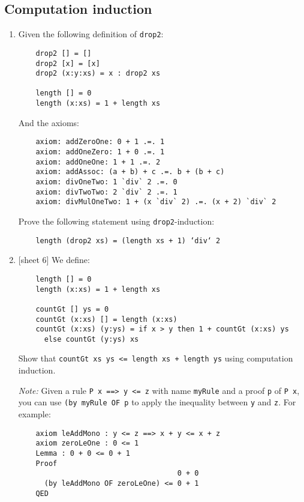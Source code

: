 \documentclass{article}
\def\code#1{\texttt{#1}}
\begin{document}
\subsection{Computation induction}
\begin{enumerate}
    \item Given the following definition of \code{drop2}:
        \begin{verbatim}
    drop2 [] = []
    drop2 [x] = [x]
    drop2 (x:y:xs) = x : drop2 xs

    length [] = 0
    length (x:xs) = 1 + length xs
        \end{verbatim}
        And the axioms:
        \begin{verbatim}
    axiom: addZeroOne: 0 + 1 .=. 1
    axiom: addOneZero: 1 + 0 .=. 1
    axiom: addOneOne: 1 + 1 .=. 2
    axiom: addAssoc: (a + b) + c .=. b + (b + c)
    axiom: divOneTwo: 1 `div` 2 .=. 0
    axiom: divTwoTwo: 2 `div` 2 .=. 1
    axiom: divMulOneTwo: 1 + (x `div` 2) .=. (x + 2) `div` 2
        \end{verbatim}
        Prove the following statement using \code{drop2}-induction:
        \begin{verbatim}
    length (drop2 xs) = (length xs + 1) ‘div‘ 2
        \end{verbatim}

    \item {[sheet 6]} We define:
        \begin{verbatim}
    length [] = 0
    length (x:xs) = 1 + length xs

    countGt [] ys = 0
    countGt (x:xs) [] = length (x:xs)
    countGt (x:xs) (y:ys) = if x > y then 1 + countGt (x:xs) ys
      else countGt (y:ys) xs
        \end{verbatim}
        Show that \code{countGt xs ys <= length xs + length ys} using computation induction. \par
        \textit{Note:} Given a rule \code{P x ==> y <= z} with name \code{myRule} and a proof \code{p} of \code{P x}, you can use \code{(by myRule OF p} to apply the inequality between \code{y} and \code{z}. For example:
        \begin{verbatim}
    axiom leAddMono : y <= z ==> x + y <= x + z
    axiom zeroLeOne : 0 <= 1
    Lemma : 0 + 0 <= 0 + 1
    Proof
                                     0 + 0
      (by leAddMono OF zeroLeOne) <= 0 + 1
    QED
        \end{verbatim}
\end{enumerate}

\printbibliography
\end{document}
